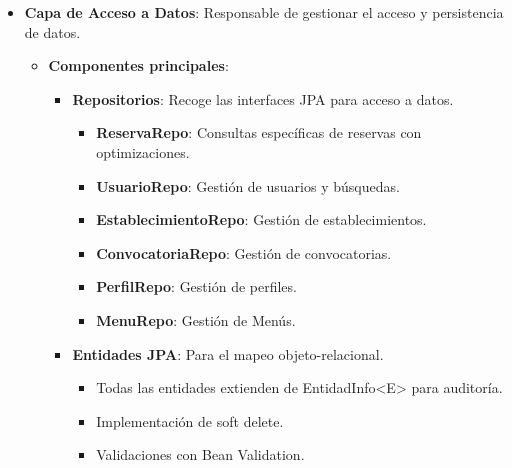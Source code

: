 \begin{itemize}
	\item \textbf{Capa de Acceso a Datos}: Responsable de gestionar el acceso y persistencia de datos.
	\begin{itemize}
       \item \textbf{Componentes principales}: 
       	\begin{itemize}
               \item \textbf{Repositorios}: Recoge las interfaces JPA para acceso a datos.
           	\begin{itemize}
                   \item \textbf{ReservaRepo}: Consultas específicas de reservas con optimizaciones.
                   \item \textbf{UsuarioRepo}: Gestión de usuarios y búsquedas.
                   \item \textbf{EstablecimientoRepo}: Gestión de establecimientos.
                   \item \textbf{ConvocatoriaRepo}: Gestión de convocatorias.
                   \item \textbf{PerfilRepo}: Gestión de perfiles.
                   \item \textbf{MenuRepo}: Gestión de Menús.
                \end{itemize}

               \item \textbf{Entidades JPA}: Para el mapeo objeto-relacional.
           	\begin{itemize}
                   \item Todas las entidades extienden de EntidadInfo<E> para auditoría.
                   \item Implementación de soft delete.
                   \item Validaciones con Bean Validation.
                \end{itemize}
            \end{itemize}
    \end{itemize}


\end{itemize}

